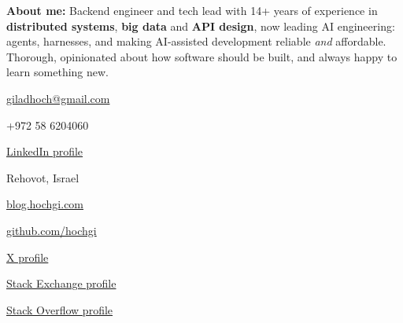 \documentclass[10pt]{cv}
\providecommand{\uniquecampaign}{unmodified}
\newcommand{\bloglink}[3][]{
    \href{https://blog.hochgi.com/#1?utm_source=cv&utm_medium=#2&utm_campaign=bonus_points_for_checking_my_blog&utm_content=\uniquecampaign}{#3}
}
\newcommand{\kw}[1]{\textbf{#1}}
\begin{document}
    \PrintableMode

    \begin{TopBar}{\ColorTextSide}

        \SimpleSeparator{\ColorHighlight}
        \RaggedRight\small{
            \textbf{About me:} Backend engineer and tech lead with 14+ years of experience in \kw{distributed systems}, \kw{big data} and \kw{API design},
            now leading AI engineering: agents, harnesses, and making AI-assisted development reliable \emph{and} affordable.
            Thorough, opinionated about how software should be built, and always happy to learn something new.
        }

        \SimpleSeparator{\ColorHighlight}
        \begin{TripleColumns}
            \begin{ItemList}{\ColorHighlight}
                \item [\Large\faEnvelopeO]      \href{mailto:giladhoch@gmail.com}{giladhoch@gmail.com} %
                \item [\Large\faPhone]          +972 58 6204060 %
                \item [\Large\faLinkedinSquare] \href{https://www.linkedin.com/in/gilad-hoch-6632a138}{LinkedIn profile} %
            \end{ItemList}
            \nextcolumn
            \begin{ItemList}{\ColorHighlight}
                \item [\Large\faMapMarker] Rehovot, Israel                                       %
                \item [\Large\faLaptop]    \bloglink{top-header}{blog.hochgi.com}                 %
                \item [\Large\faGithub]    \href{https://github.com/hochgi}{github.com/hochgi}    %
            \end{ItemList}
            \nextcolumn
            \begin{ItemList}{\ColorHighlight}
                \item [\Large$\mathbb{X}$]     \href{https://x.com/hochgi}{X profile}                                 %
                \item [\Large\faStackExchange] \href{https://stackexchange.com/users/482262/gilad-hoch?tab=accounts}{Stack Exchange profile} %
                \item [\Large\faStackOverflow] \href{https://stackoverflow.com/users/896557/gilad-hoch}{Stack Overflow profile} %
            \end{ItemList}
        \end{TripleColumns}
    \end{TopBar}
\end{document}
